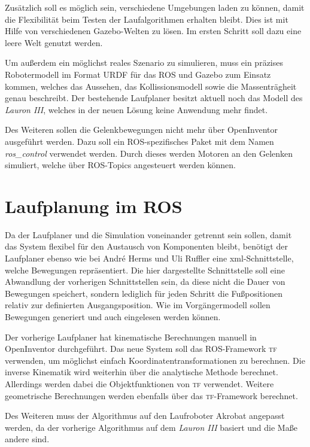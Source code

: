 Zusätzlich soll es möglich sein, verschiedene Umgebungen laden zu können, damit die Flexibilität beim Testen der Laufalgorithmen erhalten bleibt. Dies ist mit Hilfe von verschiedenen Gazebo-Welten zu lösen. Im ersten Schritt soll dazu eine leere Welt genutzt werden.

Um außerdem ein möglichst reales Szenario zu simulieren, muss ein präzises Robotermodell im Format \ac{URDF} für das \ac{ROS} und Gazebo zum Einsatz kommen, welches das Aussehen, das Kollissionsmodell sowie die Massenträgheit genau beschreibt. Der bestehende Laufplaner besitzt aktuell noch das Modell des \emph{Lauron III}, welches in der neuen Lösung keine Anwendung mehr findet.

Des Weiteren sollen die Gelenkbewegungen nicht mehr über OpenInventor \autocite{inventor} ausgeführt werden. Dazu soll ein \ac{ROS}-spezifisches Paket mit dem Namen \emph{ros\_control} verwendet werden. Durch dieses werden Motoren an den Gelenken simuliert, welche über \ac{ROS}-Topics angesteuert werden können.

\section{Laufplanung im \ac{ROS}}

Da der Laufplaner und die Simulation voneinander getrennt sein sollen, damit das System flexibel für den Austausch von Komponenten bleibt, benötigt der Laufplaner ebenso wie bei André Herms und Uli Ruffler eine xml-Schnittstelle, welche Bewegungen repräsentiert. Die hier dargestellte Schnittstelle soll eine Abwandlung der vorherigen Schnittstellen sein, da diese nicht die Dauer von Bewegungen speichert, sondern lediglich für jeden Schritt die Fußpositionen relativ zur definierten Ausgangsposition. Wie im Vorgängermodell sollen Bewegungen generiert und auch eingelesen werden können.

Der vorherige Laufplaner hat kinematische Berechnungen manuell in OpenInventor durchgeführt. Das neue System soll das \ac{ROS}-Framework \textsc{tf} verwenden, um möglichst einfach Koordinatentransformationen zu berechnen. Die inverse Kinematik wird weiterhin über die analytische Methode berechnet. Allerdings werden dabei die Objektfunktionen von \textsc{tf} verwendet. Weitere geometrische Berechnungen werden ebenfalls über das \textsc{tf}-Framework berechnet.

Des Weiteren muss der Algorithmus auf den Laufroboter Akrobat angepasst werden, da der vorherige Algorithmus auf dem \emph{Lauron III} basiert und die Maße andere sind.